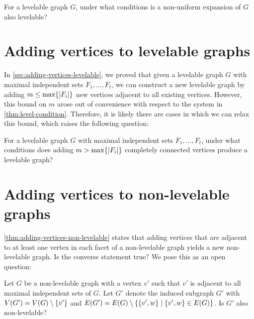 \begin{question}
For a levelable graph $G$, under what conditions is a non-uniform expansion of $G$ also levelable?
\end{question}

\section{Adding vertices to levelable graphs} In \autoref{sec:adding-vertices-levelable}, we proved that given a levelable graph $G$ with maximal independent sets $F_1, \dots, F_t$, we can construct a new levelable graph by adding $m \leq \max\{ |F_i| \}$ new vertices adjacent to all existing vertices. However, this bound on $m$ arose out of convenience with respect to the system in \autoref{thm:level-condition}. Therefore, it is likely there are cases in which we can relax this bound, which raises the following question:

\begin{question}
For a levelable graph $G$ with maximal independent sets $F_1, \dots, F_t$, under what conditions does adding $m > \max\{ |F_i| \}$ completely connected vertices produce a levelable graph?
\end{question}

\section{Adding vertices to non-levelable graphs} \label{sec:question-adding-non} \autoref{thm:adding-vertices-non-levelable} states that adding vertices that are adjacent to at least one vertex in each facet of a non-levelable graph yields a new non-levelable graph. Is the converse statement true? We pose this as an open question:
\begin{question}
Let $G$ be a non-levelable graph with a vertex $v'$ such that $v'$ is adjacent to all maximal independent sets of $G$. Let $G'$ denote the induced subgraph $G'$ with $V(G') = V(G) \setminus \{ v' \}$ and $E(G') = E(G) \setminus \{ \{ v', w \} \; | \; \{ v', w \} \in E(G) \}$. Is $G'$ also non-levelable?
\end{question}

